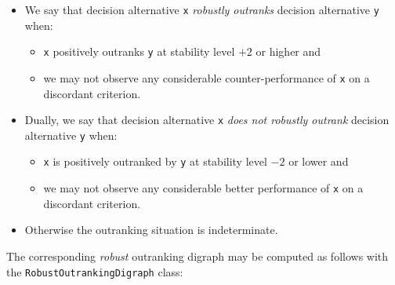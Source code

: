 \begin{definition}\label{def:19.1}
\begin{itemize}
\item We say that decision alternative \texttt{x} \emph{robustly outranks} decision alternative \texttt{y} when:
\begin{itemize}[nosep]
\item \texttt{x} positively outranks \texttt{y} at stability level $+2$ or higher and
\item we may not observe any considerable counter-performance of \texttt{x} on a discordant criterion.
\end{itemize}
\item Dually, we say that decision alternative \texttt{x} \emph{does not robustly outrank} decision alternative \texttt{y} when:
\begin{itemize}[nosep]
\item \texttt{x} is positively outranked by \texttt{y} at stability level $-2$ or lower and
\item we may not observe any considerable better performance of \texttt{x} on a discordant criterion.
\end{itemize}
\item Otherwise the outranking situation is indeterminate.
\end{itemize}
\end{definition}
The corresponding \emph{robust} outranking digraph may be computed as follows with the \texttt{RobustOutrankingDigraph} class:
